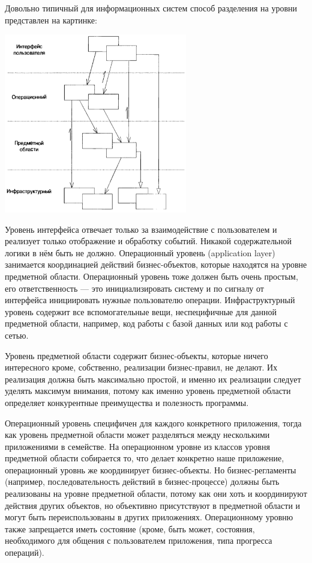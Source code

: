 \documentclass[a5paper]{article}
\begin{document}
Довольно типичный для информационных систем способ разделения на уровни представлен на картинке:

\begin{center}
    \includegraphics[width=0.6\textwidth]{layers.png}
\end{center}

Уровень интерфейса отвечает только за взаимодействие с пользователем и реализует только отображение и обработку событий. Никакой содержательной логики в нём быть не должно. Операционный уровень (application layer) занимается координацией действий бизнес-объектов, которые находятся на уровне предметной области. Операционный уровень тоже должен быть очень простым, его ответственность --- это инициализировать систему и по сигналу от интерфейса инициировать нужные пользователю операции. Инфраструктурный уровень содержит все вспомогательные вещи, неспецифичные для данной предметной области, например, код работы с базой данных или код работы с сетью.

Уровень предметной области содержит бизнес-объекты, которые ничего интересного кроме, собственно, реализации бизнес-правил, не делают. Их реализация должна быть максимально простой, и именно их реализации следует уделять максимум внимания, потому как именно уровень предметной области определяет конкурентные преимущества и полезность программы.

Операционный уровень специфичен для каждого конкретного приложения, тогда как уровень предметной области может разделяться между несколькими приложениями в семействе. На операционном уровне из классов уровня предметной области собирается то, что делает конкретно наше приложение, операционный уровнь же координирует бизнес-объекты. Но бизнес-регламенты (например, последовательность действий в бизнес-процессе) должны быть реализованы на уровне предметной области, потому как они хоть и координируют действия других объектов, но объективно присутствуют в предметной области и могут быть переиспользованы в других приложениях. Операционному уровню также запрещается иметь состояние (кроме, быть может, состояния, необходимого для общения с пользователем приложения, типа прогресса операций).
\end{document}
